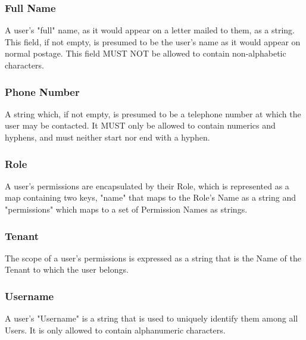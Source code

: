 \subsubsection{Full Name}
A user's "full" name, as it would appear on a letter mailed to them, as a
string. This field, if not empty, is presumed to be the user's name as it would
appear on normal postage. This field MUST NOT be allowed to contain
non-alphabetic characters.

\subsubsection{Phone Number}
A string which, if not empty, is presumed to be a telephone number at which the
user may be contacted. It MUST only be allowed to contain numerics and hyphens,
and must neither start nor end with a hyphen.

\subsubsection{Role}
A user's permissions are encapsulated by their Role, which is represented as a
map containing two keys, "name" that maps to the Role's Name as a string and
"permissions" which maps to a set of Permission Names as strings.

\subsubsection{Tenant}
The scope of a user's permissions is expressed as a string that is the Name of
the Tenant to which the user belongs.

\subsubsection{Username}
A user's "Username" is a string that is used to uniquely identify them among all
Users. It is only allowed to contain alphanumeric characters.
